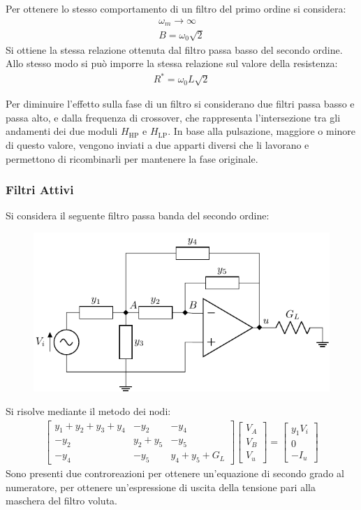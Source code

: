 \documentclass{article}
\numberwithin{equation}{subsection}
\begin{document}
Per ottenere lo stesso comportamento di un filtro del primo ordine si considera:
\begin{gather*}
    \omega_m\to\infty\\
    B=\omega_0\sqrt{2}
\end{gather*}
Si ottiene la stessa relazione ottenuta dal filtro passa basso del secondo ordine. 
Allo stesso modo si può imporre la stessa relazione sul valore della resistenza:
\begin{gather}
    R^*=\omega_0L\sqrt2
\end{gather}

Per diminuire l'effetto sulla fase di un filtro si considerano due filtri passa basso e passa alto, e dalla frequenza di crossover, che rappresenta 
l'intersezione tra gli andamenti dei due moduli $H_{\mathrm{HP}}$ e $H_{\mathrm{LP}}$. In base alla pulsazione, maggiore o minore di questo valore, vengono inviati 
a due apparti diversi che li lavorano e permettono di ricombinarli per mantenere la fase originale. 

\subsubsection{Filtri Attivi}

Si considera il seguente filtro passa banda del secondo ordine:
\begin{figure}[H]%
    \centering
    \includegraphics{filtro-attivo-1.pdf}%
\end{figure}    
Si risolve mediante il metodo dei nodi:
\begin{gather*}
    \begin{bmatrix}
        y_1+y_2+y_3+y_4&-y_2&-y_4\\
        -y_2&y_2+y_5&-y_5\\
        -y_4&-y_5&y_4+y_5+G_L
    \end{bmatrix}\begin{bmatrix}
        V_A\\V_B\\V_u
    \end{bmatrix}=\begin{bmatrix}
        y_1V_i\\0\\-I_u
    \end{bmatrix}
\end{gather*}
Sono presenti due controreazioni per ottenere un'equazione di secondo grado al numeratore, per ottenere un'espressione di uscita della tensione 
pari alla maschera del filtro voluta. 
\end{document}
